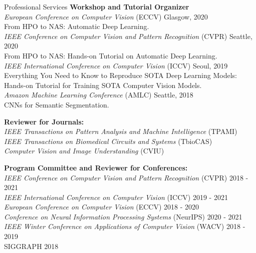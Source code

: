 \documentclass{resume} %
\begin{document}
\begin{rSection}{Professional Services}
{\bf Workshop and Tutorial Organizer} \\
{\it European Conference on Computer Vision} (ECCV) \hfill{Glasgow, 2020}\\
From HPO to NAS: Automatic Deep Learning. \\

{\it IEEE Conference on Computer Vision and Pattern Recognition} (CVPR) \hfill{Seattle, 2020}\\
From HPO to NAS: Hands-on Tutorial on Automatic Deep Learning. \\

{\it IEEE International Conference on Computer Vision} (ICCV) \hfill{Seoul, 2019}\\
Everything You Need to Know to Reproduce SOTA Deep Learning Models: \\
Hands-on Tutorial for Training SOTA Computer Vision Models. \\

{\it Amazon Machine Learning Conference} (AMLC) \hfill{Seattle, 2018}\\
CNNs for Semantic Segmentation. 

{\bf Reviewer for Journals:} \\
{\it IEEE Transactions on Pattern Analysis and Machine Intelligence} (TPAMI) \\
{\it IEEE Transactions on Biomedical Circuits and Systems} (TbioCAS) \\
{\it Computer Vision and Image Understanding} (CVIU)

{\bf Program Committee and Reviewer for Conferences:} \\
{\it IEEE Conference on Computer Vision and Pattern Recognition} (CVPR) \hfill{2018 - 2021}\\
{\it IEEE International Conference on Computer Vision} (ICCV)  \hfill{2019 - 2021}\\
{\it European Conference on Computer Vision} (ECCV) \hfill{2018 - 2020}\\
{\it Conference on Neural Information Processing Systems} (NeurIPS) \hfill{2020 - 2021}\\
{\it IEEE Winter Conference on Applications of Computer Vision} (WACV)  \hfill{2018 - 2019}\\
SIGGRAPH  \hfill{2018}


\end{rSection}
\end{document}
